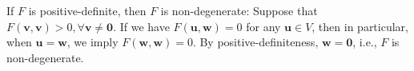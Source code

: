 \begin{remark}
If $F$ is positive-definite, then $F$ is non-degenerate:
Suppose that $F(\bm v,\bm v)>0,\forall\bm v\ne\bm0$.
If we have $F(\bm u,\bm w)=0$ for any $\bm u\in V$, then in particular, when $\bm u=\bm w$, we imply $F(\bm w,\bm w)=0$. By positive-definiteness, $\bm w=\bm0$, i.e., $F$ is non-degenerate.
\end{remark}




















